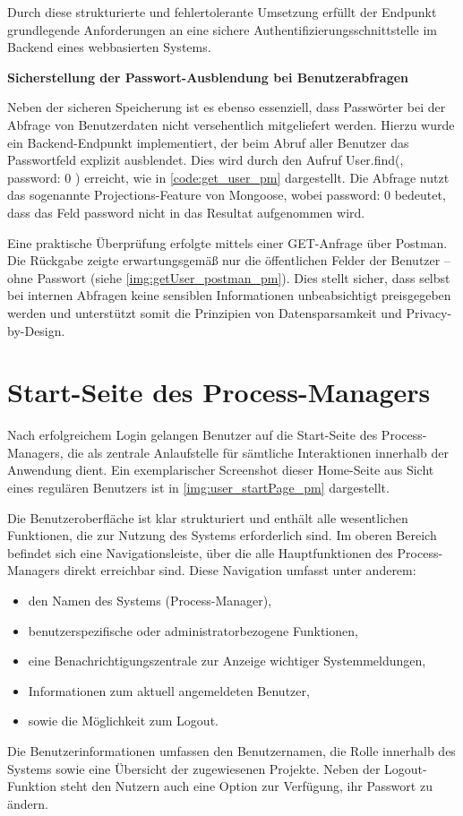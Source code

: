Durch diese strukturierte und fehlertolerante Umsetzung erfüllt der Endpunkt grundlegende Anforderungen an eine sichere Authentifizierungsschnittstelle im Backend eines webbasierten Systems.

\newpage
\textbf{Sicherstellung der Passwort-Ausblendung bei Benutzerabfragen}

Neben der sicheren Speicherung ist es ebenso essenziell, dass Passwörter bei der Abfrage von Benutzerdaten nicht versehentlich mitgeliefert werden. Hierzu wurde ein Backend-Endpunkt implementiert, der beim Abruf aller Benutzer das Passwortfeld explizit ausblendet. Dies wird durch den Aufruf \glqq User.find({}, { password: 0 })\grqq{} erreicht, wie in \autoref{code:get_user_pm} dargestellt. Die Abfrage nutzt das sogenannte Projections-Feature von Mongoose, wobei { password: 0 } bedeutet, dass das Feld \glqq password\grqq{} nicht in das Resultat aufgenommen wird.

Eine praktische Überprüfung erfolgte mittels einer GET-Anfrage über Postman. Die Rückgabe zeigte erwartungsgemäß nur die öffentlichen Felder der Benutzer – ohne Passwort (siehe \autoref{img:getUser_postman_pm}). Dies stellt sicher, dass selbst bei internen Abfragen keine sensiblen Informationen unbeabsichtigt preisgegeben werden und unterstützt somit die Prinzipien von Datensparsamkeit und Privacy-by-Design.


\newpage
\section{Start-Seite des Process-Managers}
Nach erfolgreichem Login gelangen Benutzer auf die Start-Seite des Process-Managers, die als zentrale Anlaufstelle für sämtliche Interaktionen innerhalb der Anwendung dient. Ein exemplarischer Screenshot dieser Home-Seite aus Sicht eines regulären Benutzers ist in \autoref{img:user_startPage_pm} dargestellt.

Die Benutzeroberfläche ist klar strukturiert und enthält alle wesentlichen Funktionen, die zur Nutzung des Systems erforderlich sind. Im oberen Bereich befindet sich eine Navigationsleiste, über die alle Hauptfunktionen des Process-Managers direkt erreichbar sind. Diese Navigation umfasst unter anderem: \begin{itemize} \item den Namen des Systems (Process-Manager), \item benutzerspezifische oder administratorbezogene Funktionen, \item eine Benachrichtigungszentrale zur Anzeige wichtiger Systemmeldungen, \item Informationen zum aktuell angemeldeten Benutzer, \item sowie die Möglichkeit zum Logout. \end{itemize}
Die Benutzerinformationen umfassen den Benutzernamen, die Rolle innerhalb des Systems sowie eine Übersicht der zugewiesenen Projekte. Neben der Logout-Funktion steht den Nutzern auch eine Option zur Verfügung, ihr Passwort zu ändern.

